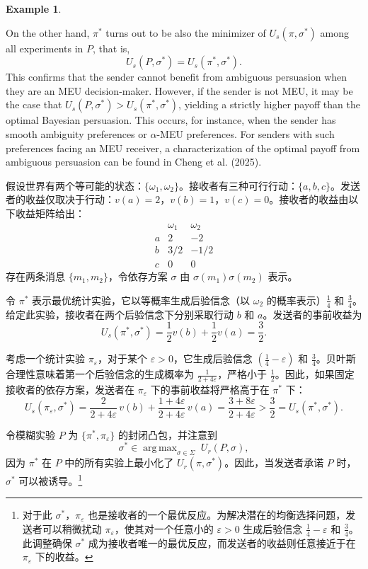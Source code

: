 \documentclass[12pt,a4paper]{article}
\theoremstyle{definition}
\newtheorem{example}{Example}[section]
\theoremstyle{remark}
\newenvironment{original}{%
    \par\medskip\noindent%
    \begin{tcolorbox}[%
        colback=white,%
        colframe=black!50,%
        title=\textbf{Original English},%
        fonttitle=\small\bfseries,%
        left=0pt, right=0pt, top=2pt, bottom=2pt,%
        boxrule=0.5pt,%
        arc=0pt,%
        outer arc=0pt%
    ]%
    \small%
}{%
    \end{tcolorbox}%
}
\newenvironment{translation}{%
    \par\smallskip\noindent%
    \begin{tcolorbox}[%
        colback=blue!3!white,%
        colframe=blue!40!black,%
        title=\textbf{中文翻译},%
        fonttitle=\small\bfseries,%
        left=0pt, right=0pt, top=2pt, bottom=2pt,%
        boxrule=0.5pt,%
        arc=0pt,%
        outer arc=0pt%
    ]%
    \small\color{blue!60!black}%
}{%
    \end{tcolorbox}\medskip%
}
\DeclareMathOperator{\argmax}{arg\,max}
\begin{document}
\begin{example}
\begin{original}
On the other hand, $\pi^*$ turns out to be also the minimizer of $U_s(\pi, \sigma^*)$ among all experiments in $P$, that is,
\[
U_s(P, \sigma^*) = U_s(\pi^*, \sigma^*).
\]
This confirms that the sender cannot benefit from ambiguous persuasion when they are an MEU decision-maker. However, if the sender is not MEU, it may be the case that $U_s(P, \sigma^*) > U_s(\pi^*, \sigma^*)$, yielding a strictly higher payoff than the optimal Bayesian persuasion. This occurs, for instance, when the sender has smooth ambiguity preferences or $\alpha$-MEU preferences. For senders with such preferences facing an MEU receiver, a characterization of the optimal payoff from ambiguous persuasion can be found in Cheng et al. (2025).
\end{original}
\begin{translation}
假设世界有两个等可能的状态：$\{\omega_1, \omega_2\}$。接收者有三种可行行动：$\{a, b, c\}$。发送者的收益仅取决于行动：$v(a) = 2$，$v(b) = 1$，$v(c) = 0$。接收者的收益由以下收益矩阵给出：
\[
\begin{array}{c|cc}
 & \omega_1 & \omega_2 \\
\hline
a & 2 & -2 \\
b & 3/2 & -1/2 \\
c & 0 & 0
\end{array}
\]
存在两条消息 $\{m_1, m_2\}$，令依存方案 $\sigma$ 由 $\sigma(m_1)\sigma(m_2)$ 表示。

令 $\pi^*$ 表示最优统计实验，它以等概率生成后验信念（以 $\omega_2$ 的概率表示）$\frac{1}{4}$ 和 $\frac{3}{4}$。给定此实验，接收者在两个后验信念下分别采取行动 $b$ 和 $a$。发送者的事前收益为
\[
U_s(\pi^*, \sigma^*) = \frac{1}{2} v(b) + \frac{1}{2} v(a) = \frac{3}{2}.
\]

考虑一个统计实验 $\pi_\varepsilon$，对于某个 $\varepsilon > 0$，它生成后验信念 $(\frac{1}{4} - \varepsilon)$ 和 $\frac{3}{4}$。贝叶斯合理性意味着第一个后验信念的生成概率为 $\frac{1}{2+4\varepsilon}$，严格小于 $\frac{1}{2}$。因此，如果固定接收者的依存方案，发送者在 $\pi_\varepsilon$ 下的事前收益将严格高于在 $\pi^*$ 下：
\[
U_s(\pi_\varepsilon, \sigma^*) = \frac{2}{2+4\varepsilon} \, v(b) + \frac{1+4\varepsilon}{2+4\varepsilon} \, v(a) = \frac{3+8\varepsilon}{2+4\varepsilon} > \frac{3}{2} = U_s(\pi^*, \sigma^*).
\]

令模糊实验 $P$ 为 $\{\pi^*, \pi_\varepsilon\}$ 的封闭凸包，并注意到
\[
\sigma^* \in \argmax_{\sigma \in \Sigma} \; U_r(P, \sigma),
\]
因为 $\pi^*$ 在 $P$ 中的所有实验上最小化了 $U_r(\pi, \sigma^*)$。因此，当发送者承诺 $P$ 时，$\sigma^*$ 可以被诱导。\footnote{对于此 $\sigma^*$，$\pi_\varepsilon$ 也是接收者的一个最优反应。为解决潜在的均衡选择问题，发送者可以稍微扰动 $\pi_\varepsilon$，使其对一个任意小的 $\varepsilon > 0$ 生成后验信念 $\frac{1}{4} - \varepsilon$ 和 $\frac{3}{4}$。此调整确保 $\sigma^*$ 成为接收者唯一的最优反应，而发送者的收益则任意接近于在 $\pi_\varepsilon$ 下的收益。}


\end{translation}
\end{example}
\end{document}
